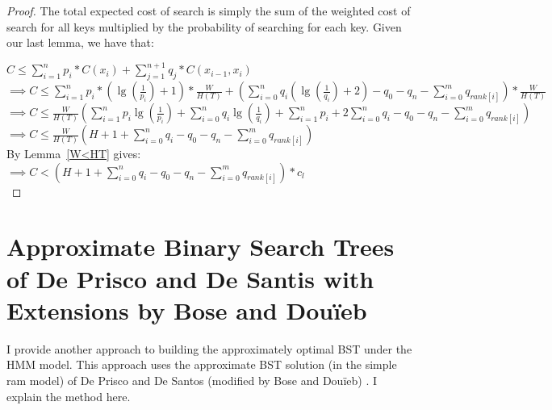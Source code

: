 \documentclass[letterpaper,12pt,titlepage,oneside,final]{book}
\theoremstyle{plain}
\begin{document}
\begin{proof}
The total expected cost of search is simply the sum of the weighted cost of search for all keys multiplied by the probability of searching for each key. Given our last lemma, we have that:

$C \leq \sum_{i=1}^{n} p_i*C(x_i) + \sum_{j=1}^{n+1} q_j*C(x_{i-1},x_i)$ \\

$\implies C \leq \sum_{i=1}^{n} p_i*(\lg(\frac{1}{p_i})+1)*\frac{W}{H(T)} + (\sum_{i=0}^{n} q_i(\lg(\frac{1}{q_i})+2) - q_0 - q_n -  \sum_{i=0}^m q_{rank[i]} )*\frac{W}{H(T)} $ \\

$\implies C \leq \frac{W}{H(T)} (\sum_{i=1}^{n} p_i\lg(\frac{1}{p_i}) + \sum_{i=0}^{n} q_i\lg(\frac{1}{q_i}) + \sum_{i=1}^{n} p_i + 2\sum_{i=0}^{n} q_i - q_0 - q_n - \sum_{i=0}^m q_{rank[i]} )$ \\

$\implies C \leq  \frac{W}{H(T)} (H + 1 + \sum_{i=0}^n q_i - q_0 - q_n - \sum_{i=0}^m q_{rank[i]})$ \\

By Lemma~\ref{W<HT} gives: \\
$\implies C < (H + 1 + \sum_{i=0}^n q_i - q_0 - q_n - \sum_{i=0}^m q_{rank[i]}) * c_l$ \\

\end{proof}


\section{Approximate Binary Search Trees of De Prisco and De Santis with Extensions by Bose and Dou\"{i}eb} \label{sec:deBST}

I provide another approach to building the approximately optimal BST under the HMM model. This approach uses the approximate BST solution (in the simple ram model) of De Prisco and De Santos (modified by Bose and Dou\"{i}eb) \cite{de1993binary} \cite{bose2009efficient}. I explain the method here. \\
\end{document}
